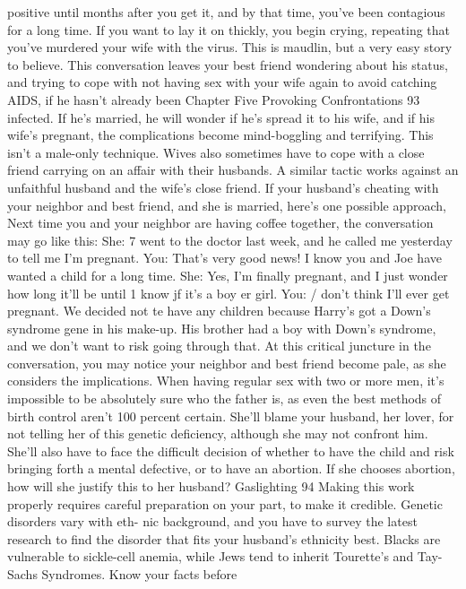 \documentclass{book}
\begin{document}
positive until months after you get it, and by that time, 
you've been contagious for a long time. 
If you want to lay it on thickly, you begin crying, repeating 
that you've murdered your wife with the virus. This is maudlin, 
but a very easy story to believe. 
This conversation leaves your best friend wondering about 
his status, and trying to cope with not having sex with your 
wife again to avoid catching AIDS, if he hasn't already been 
Chapter Five 
Provoking Confrontations 
93 
infected. If he's married, he will wonder if he’s spread it to his 
wife, and if his wife's pregnant, the complications become 
mind-boggling and terrifying. 
This isn't a male-only technique. Wives also sometimes 
have to cope with a close friend carrying on an affair with their 
husbands. A similar tactic works against an unfaithful husband 
and the wife's close friend. If your husband's cheating with your 
neighbor and best friend, and she is married, here's one possible 
approach, Next time you and your neighbor are having coffee 
together, the conversation may go like this: 
She: 7 went to the doctor last week, and he called me yesterday 
to tell me I'm pregnant. 
You: That's very good news! I know you and Joe have wanted 
a child for a long time. 
She: Yes, I'm finally pregnant, and I just wonder how long it'll 
be until 1 know jf it's a boy er girl. 
You: / don't think I'll ever get pregnant. We decided not te 
have any children because Harry's got a Down's syndrome 
gene in his make-up. His brother had a boy with Down's 
syndrome, and we don't want to risk going through that. 
At this critical juncture in the conversation, you may notice 
your neighbor and best friend become pale, as she considers the 
implications. When having regular sex with two or more men, 
it's impossible to be absolutely sure who the father is, as even 
the best methods of birth control aren't 100 percent certain. 
She'll blame your husband, her lover, for not telling her of this 
genetic deficiency, although she may not confront him. She'll 
also have to face the difficult decision of whether to have the 
child and risk bringing forth a mental defective, or to have an 
abortion. If she chooses abortion, how will she justify this to 
her husband?  Gaslighting 
94 
Making this work properly requires careful preparation on 
your part, to make it credible. Genetic disorders vary with eth- 
nic background, and you have to survey the latest research to 
find the disorder that fits your husband's ethnicity best. Blacks 
are vulnerable to sickle-cell anemia, while Jews tend to inherit 
Tourette's and Tay-Sachs Syndromes. Know your facts before 
\end{document}
